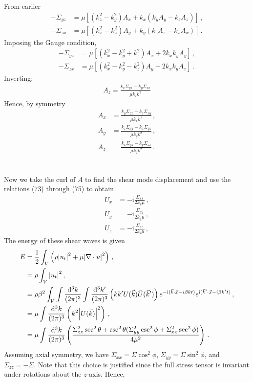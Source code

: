 \documentclass{article}
\newcommand*\diff{\mathop{}\!\mathrm{d}}
\newcommand*\te[1]{\text{#1}}
\newcommand*\p[1]{\left(#1\right)}
\newcommand*\ps[1]{\left[#1\right]}
\newcommand*\f[2]{\frac{#1}{#2}}
\newcommand*\I{\te{i}}
\begin{document}
From earlier
\begin{align}
-\Sigma_{yz}&=\mu\ps{(k_z^2-k_y^2) A_x+k_x(k_y A_y-k_z A_z)}\,,\\
-\Sigma_{zx}&=\mu\ps{(k_x^2-k_z^2) A_y+k_y(k_z A_z-k_x A_x)}\,.
\end{align}
Imposing the Gauge condition,
\begin{align}
-\Sigma_{yz}&=\mu\ps{(k_x^2-k_y^2+k_z^2) A_x+2k_xk_y A_y}\,,\\
-\Sigma_{zx}&=\mu\ps{(k_x^2-k_y^2-k_z^2) A_y-2k_x k_y A_x}\,.
\end{align}
Inverting:
\begin{align}
A_z=\f{k_x\Sigma_{yz}-k_y\Sigma_{zx}}{\mu k_z k^2}
\end{align}
Hence, by symmetry
\begin{align}
A_x&=\f{k_y\Sigma_{zx}-k_z\Sigma_{xy}}{\mu k_x k^2}\,,\\
A_y&=\f{k_z\Sigma_{xy}-k_x\Sigma_{yz}}{\mu k_y k^2}\,,\\
A_z&=\f{k_x\Sigma_{yz}-k_y\Sigma_{zx}}{\mu k_z k^2}\,.
\end{align}
\\\\
Now we take the curl of $A$ to find the shear mode displacement and use the relations (73) through (75) to obtain
\begin{align}
U_x&=-\I\f{\Sigma_{xx}}{2k_x\mu}\,,\\
U_y&=-\I\f{\Sigma_{yy}}{2k_y\mu}\,,\\
U_z&=-\I\f{\Sigma_{zz}}{2k_z\mu}\,,
\end{align}
The energy of these shear waves is given
\begin{align}
E&=\f12\int_V\p{\rho\abs{u_t}^2+\mu\abs{\nabla\cdot u}^2}\,,\\
&=\rho\int_V\abs{u_t}^2\,,\\
&=\rho\beta^2\int_V\int\f{\diff^3 k}{(2\pi)^3}\int\f{\diff^3 k'}{(2\pi)^3}\p{k k'U(\vec k)\bar U(\vec k')}e^{-\I(\vec k\cdot\vec x-i\beta k t)}e^{\I(\vec k'\cdot\vec x-i\beta k' t)}\,,\\
&=\mu\int\f{\diff^3 k}{(2\pi)^3}\p{k^2\abs{U(\vec k)}^2}\,,\\
&=\mu\int\f{\diff^3 k}{(2\pi)^3}\p{\f{\Sigma_{zz}^2\sec^2\theta+\csc^2\theta(\Sigma_{yy}^2\csc^2\phi+\Sigma_{xx}^2\sec^2\phi)}{4\mu^2}}\,.
\end{align}
Assuming axial symmetry, we have $\Sigma_{xx}=\Sigma\cos^2\phi$, $\Sigma_{yy}=\Sigma\sin^2\phi$, and $\Sigma_{zz}=-\Sigma$. Note that this choice is justified since the full stress tensor is invariant under rotations about the $z$-axis. Hence, 
\end{document}
